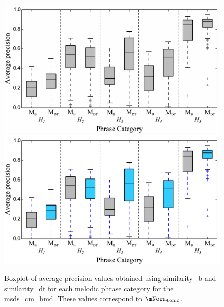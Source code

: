 \begin{figure}
	\begin{center}
		\ifdefined\PRINTVER
			\includegraphics[width=\figSizeNinety]{ch06_patterns/figures/ImprovingSimilarity/HindustaniPerCategoryPerformance_BOXPLOT_BW.pdf}
		\else
			\includegraphics[width=\figSizeNinety]{ch06_patterns/figures/ImprovingSimilarity/HindustaniPerCategoryPerformance_BOXPLOT.pdf}
		\fi
	\end{center}
	\caption[Boxplot of average precision for different types of melodic patterns in the Hindustani music dataset]{Boxplot of average precision values obtained using \acrshort{similarity_b} and \acrshort{similarity_dt} for each melodic phrase category for the \acrshort{msds_cm_hmd}. These values correspond to $\mNorm_\mathrm{tonic}$.} 
	\label{fig:hinudstaniPerCategoryPerformance}
\end{figure}


